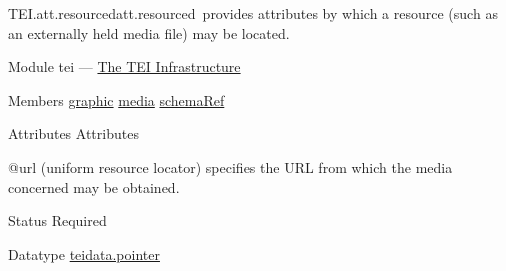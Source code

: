 \begin{reflist}
\item[]\begin{specHead}{TEI.att.resourced}{att.resourced} provides attributes by which a resource (such as an externally held media file) may be located.\end{specHead} 
    \item[{Module}]
  tei — \hyperref[ST]{The TEI Infrastructure}
    \item[{Members}]
  \hyperref[TEI.graphic]{graphic} \hyperref[TEI.media]{media} \hyperref[TEI.schemaRef]{schemaRef}
    \item[{Attributes}]
  Attributes\hfil\\[-10pt]\begin{sansreflist}
    \item[@url]
  (uniform resource locator) specifies the URL from which the media concerned may be obtained.
\begin{reflist}
    \item[{Status}]
  Required
    \item[{Datatype}]
  \hyperref[TEI.teidata.pointer]{teidata.pointer}
\end{reflist}  
\end{sansreflist}  
\end{reflist}  
